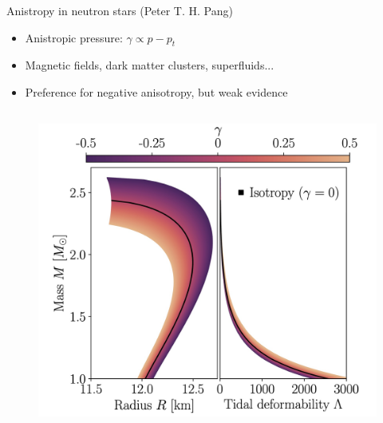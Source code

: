 \documentclass[usenames,dvipsnames,t]{beamer}
\begin{document}
\begin{frame}{Anistropy in neutron stars \small (Peter T. H. Pang) \normalsize}

  \def\x{1mm}

  \begin{itemize}
    \item Anistropic pressure: $\gamma \propto p - p_t$

    \vspace{\x}
    
    \item<2-> Magnetic fields, dark matter clusters, superfluids...

    \vspace{\x}
    
    \item<3-> Preference for negative anisotropy, but weak evidence~\cite{Pang:2025fes}
  \end{itemize}

  \begin{columns}
    \begin{column}{0.475\textwidth}
      \begin{figure}
        \centering
        \includegraphics[width=0.99\linewidth]{Figures/anisotropy.jpg}
      \end{figure}
      
    \end{column}
    

\end{columns}
\end{frame}
\end{document}

